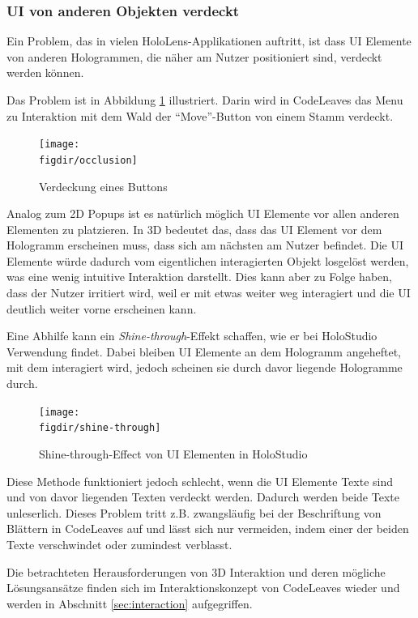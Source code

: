 \subsubsection*{UI von anderen Objekten verdeckt}

Ein Problem, das in vielen HoloLens-Applikationen auftritt, ist dass UI Elemente von anderen Hologrammen, die näher am Nutzer positioniert sind, verdeckt werden können.

Das Problem ist in Abbildung \ref{fig:occlusion} illustriert. Darin wird in CodeLeaves das Menu zu Interaktion mit dem Wald der "`Move"'-Button von einem Stamm verdeckt.

\begin{figure}[htb]
  \texttt{[image: \\figdir/occlusion]}
  \caption{Verdeckung eines Buttons}
  \label{fig:occlusion}
\end{figure}

Analog zum 2D Popups ist es natürlich möglich UI Elemente vor allen anderen Elementen zu platzieren. In 3D bedeutet das, dass das UI Element vor dem Hologramm erscheinen muss, dass sich am nächsten am Nutzer befindet. Die UI Elemente würde dadurch vom eigentlichen interagierten Objekt losgelöst werden, was eine wenig intuitive Interaktion darstellt. Dies kann aber zu Folge haben, dass der Nutzer irritiert wird, weil er mit etwas weiter weg interagiert und die UI deutlich weiter vorne erscheinen kann.

Eine Abhilfe kann ein \textit{Shine-through}-Effekt schaffen, wie er bei HoloStudio Verwendung findet. Dabei bleiben UI Elemente an dem Hologramm angeheftet, mit dem interagiert wird, jedoch scheinen sie durch davor liegende Hologramme durch.

\begin{figure}[htb]
  \texttt{[image: \\figdir/shine-through]}
  \caption{Shine-through-Effect von UI Elementen in HoloStudio \cite{windows2017casestudy3}}
  \label{fig:shine-through}
\end{figure}

Diese Methode funktioniert jedoch schlecht, wenn die UI Elemente Texte sind und von davor liegenden Texten verdeckt werden. Dadurch werden beide Texte unleserlich. Dieses Problem tritt z.B. zwangsläufig bei der Beschriftung von Blättern in CodeLeaves auf und lässt sich nur vermeiden, indem einer der beiden Texte verschwindet oder zumindest verblasst.

Die betrachteten Herausforderungen von 3D Interaktion und deren mögliche Lösungsansätze finden sich im Interaktionskonzept von CodeLeaves wieder und werden in Abschnitt \ref{sec:interaction} aufgegriffen.

